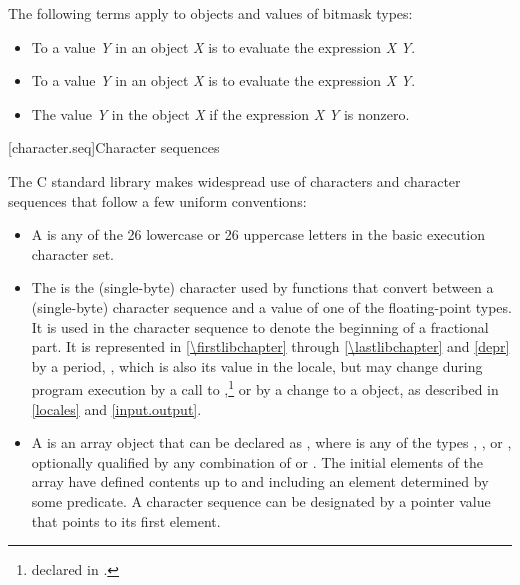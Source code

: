 \pnum
The following terms apply to objects and values of
bitmask types:
\begin{itemize}
\item
To 
a value \textit{Y} in an object \textit{X}
is to evaluate the expression \textit{X} \tcode{|=} \textit{Y}.
\item
To 
a value \textit{Y} in an object
\textit{X} is to evaluate the expression \textit{X} \tcode{\&= \~}\textit{Y}.
\item
The value \textit{Y}  in the object
\textit{X} if the expression \textit{X} \tcode{\&} \textit{Y} is nonzero.
\end{itemize}

[character.seq]{Character sequences}

\pnum
The C standard library makes widespread use
%
of characters and character sequences that follow a few uniform conventions:

\begin{itemize}
\item
A  is any of the 26 lowercase or 26
%
%
uppercase letters in the basic execution character set.
\item
The
is the
(single-byte) character used by functions that convert between a (single-byte)
character sequence and a value of one of the floating-point types.
It is used
in the character sequence to denote the beginning of a fractional part.
It is
represented in \ref{\firstlibchapter} through \ref{\lastlibchapter}
and \ref{depr} by a period,
%
,
which is
also its value in the 
locale, but may change during program
execution by a call to
,\footnote{declared in
.
%
%
%
}
or by a change to a
object, as described in \ref{locales} and \ref{input.output}.
\item
A
is an array object  that
can be declared as
,
where  is any of the types
,
,
or
, optionally qualified by any combination of
or
.
The initial elements of the
array have defined contents up to and including an element determined by some
predicate.
A character sequence can be designated by a pointer value
 that points to its first element.
\end{itemize}

